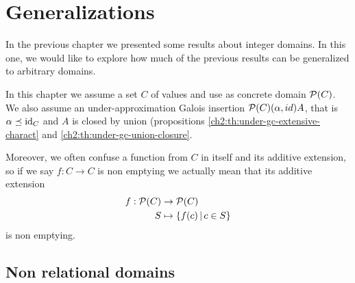 \chapter{Generalizations}
In the previous chapter we presented some results about integer domains. In this one, we would like to explore how much of the previous results can be generalized to arbitrary domains.

In this chapter we assume a set $C$ of values and use as concrete domain $\mathcal{P}(C)$. We also assume an under-approximation Galois insertion $\mathcal{P}(C) (\alpha, id) A$, that is $\alpha \preceq \text{id}_C$ and $A$ is closed by union (propositions \ref{ch2:th:under-gc-extensive-charact} and \ref{ch2:th:under-gc-union-closure}.


Moreover, we often confuse a function from $C$ in itself and its additive extension, so if we say $f: C \rightarrow C$ is non emptying we actually mean that its additive extension
\begin{align*}
	f: \mathcal{P}(C) &\rightarrow \mathcal{P}(C)	\\
	S & \mapsto \{ f(c) \,\vert\, c \in S \}
\end{align*}
is non emptying.

\section{Non relational domains}

